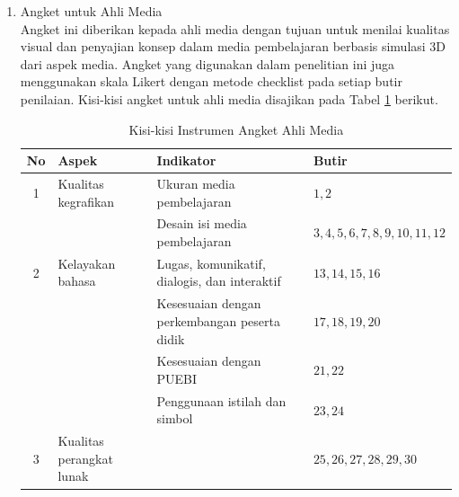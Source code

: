 \begin{enumerate}
\begin{enumerate}
\begin{enumerate}
\begin{table}[H]
\begin{tabular}{|c|p{2.5cm}|p{6cm}|p{3.5cm}|}
                \hline
                \end{tabular}
            \end{table}
            \item Angket untuk Ahli Media\\
            \hspace*{1cm}Angket ini diberikan kepada ahli media dengan tujuan untuk menilai kualitas visual dan penyajian konsep dalam media pembelajaran berbasis simulasi 3D dari aspek media. Angket yang digunakan dalam penelitian ini juga menggunakan skala Likert dengan metode checklist pada setiap butir penilaian. Kisi-kisi angket untuk ahli media disajikan pada Tabel \ref{kisiahlimedia} berikut.
            \begin{table}[H]
                \centering
                \caption{Kisi-kisi Instrumen Angket Ahli Media}
                \label{kisiahlimedia}
                \begin{tabular}{|c|p{3.5cm}|p{5.5cm}|p{4.5cm}|}
                    \hline
                    \textbf{No} & \textbf{Aspek} & \textbf{Indikator} & \textbf{Butir}\\
                    \hline
                    1 & Kualitas kegrafikan & Ukuran media pembelajaran & \(1,2\)\\
                    && Desain isi media pembelajaran & \(3,4,5,6,7,8,9,10,11,12\)\\
                    \hline
                    2 & Kelayakan bahasa & Lugas, komunikatif, dialogis, dan interaktif & \(13,14,15,16\)\\
                    && Kesesuaian dengan perkembangan peserta didik & \(17,18,19,20\)\\
                    && Kesesuaian dengan PUEBI & \(21,22\)\\
                    && Penggunaan istilah dan simbol & \(23,24\)\\
                    \hline
                    3 & Kualitas perangkat lunak & & \(25,26,27,28,29,30\)\\
                    \hline
                    

\end{tabular}
\end{table}
\end{enumerate}
\end{enumerate}
\end{enumerate}

